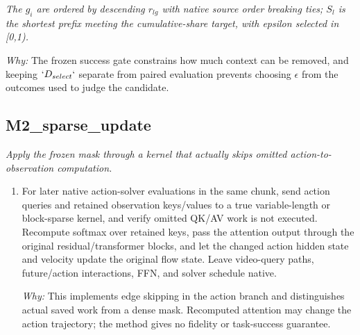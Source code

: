 \documentclass[10pt,a4paper]{article}
\begin{document}
\begin{enumerate}[leftmargin=*,start=3]
\noindent\emph{The \(g_{i}\) are ordered by descending \(r_{lg}\) with native source order breaking ties;\allowbreak{} \(S_{l}\) is the shortest prefix meeting the cumulative-share target, with epsilon selected in [0,1).}
\par{}
\par\emph{Why:} The frozen success gate constrains how much context can be removed, and keeping \(`D_{select}`\) separate from paired evaluation prevents choosing \(\epsilon \) from the outcomes used to judge the candidate.
\end{enumerate}
\subsection*{M2\_sparse\_update}
\emph{Apply the frozen mask through a kernel that actually skips omitted action-to-observation computation.}
\begin{enumerate}[leftmargin=*,start=5]
  \item For later native action-solver evaluations in the same chunk, send action queries and retained observation keys/values to a true variable-length or block-sparse kernel, and verify omitted QK/AV work is not executed. Recompute softmax over retained keys, pass the attention output through the original residual/transformer blocks, and let the changed action hidden state and velocity update the original flow state. Leave video-query paths, future/action interactions, FFN, and solver schedule native.
\par\emph{Why:} This implements edge skipping in the action branch and distinguishes actual saved work from a dense mask. Recomputed attention may change the action trajectory;\allowbreak{} the method gives no fidelity or task-success guarantee.
\end{enumerate}
\end{document}
